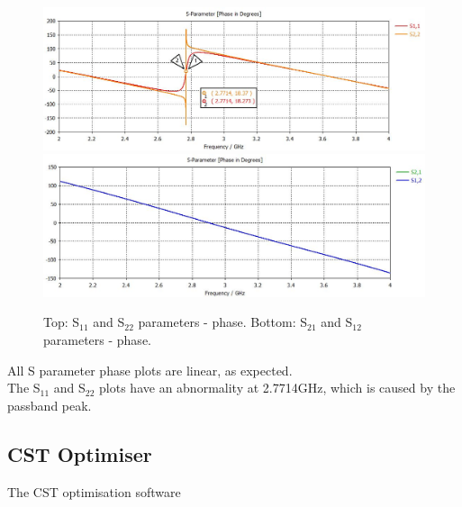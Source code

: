 \documentclass{paper}
\begin{document}
\begin{figure}[H]
	\centering
	\includegraphics[scale=0.4]{IMG/S11_and_S22_phase}
	\includegraphics[scale=0.4]{IMG/S21_and_S12_phase}
	\caption{Top: S$_{11}$ and S$_{22}$ parameters - phase. Bottom: S$_{21}$ and S$_{12}$ parameters - phase.}
	\label{fig:s11_s22_s21_s12_phase}
\end{figure}

All S parameter phase plots are linear, as expected. \\

The S$_{11}$ and S$_{22}$ plots have an abnormality at 2.7714GHz, which is caused by the passband peak.\\

\subsection{CST Optimiser}
The CST optimisation software 
\end{document}
